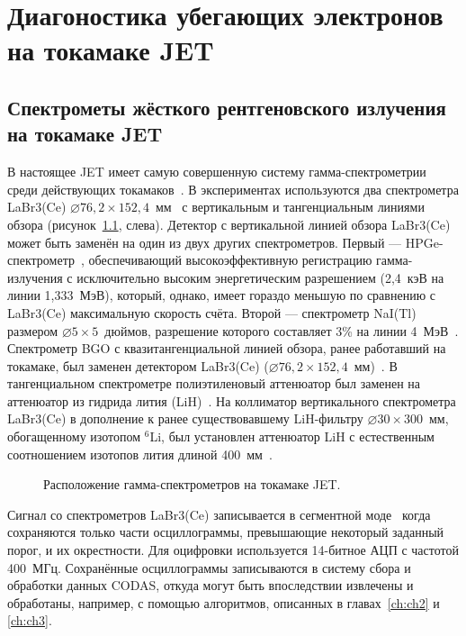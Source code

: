 \chapter{Диагоностика убегающих электронов на токамаке JET}
\label{ch:ch5}


\section{Спектрометы жёсткого рентгеновского излучения на токамаке JET}

В настоящее JET имеет самую совершенную систему гамма-спектрометрии среди действующих токамаков~\cite{Iliasova2022}. В экспериментах используются два спектрометра LaBr3(Ce) $\varnothing 76,2 \times 152,4$~мм~\cite{Nocente2010} с вертикальным и тангенциальным линиями обзора (рисунок~\ref{fig:jetHxrDetectorsScheme}, слева). Детектор с вертикальной линией обзора LaBr3(Ce) может быть заменён на один из двух других спектрометров. Первый --- HPGe-спектрометр~\cite{Tardocchi2011}, обеспечивающий высокоэффективную регистрацию гамма-излучения с исключительно высоким энергетическим разрешением (2,4~кэВ на линии 1,333~МэВ), который, однако, имеет гораздо меньшую по сравнению с LaBr3(Ce) максимальную скорость счёта. Второй --- спектрометр NaI(Tl) размером $\varnothing 5 \times 5$~дюймов, разрешение которого составляет 3\% на линии 4~МэВ~\cite{Tardocchi2008}. Спектрометр BGO с квазитангенциальной линией обзора, ранее работавший на токамаке, был заменен детектором LaBr3(Ce) ($\varnothing 76,2 \times 152,4$~мм)~\cite{Nocente2021}. В тангенциальном спектрометре полиэтиленовый аттенюатор был заменен на аттенюатор из гидрида лития (LiH)~\cite{Curuia2017}. На коллиматор вертикального спектрометра LaBr3(Ce) в дополнение к ранее существовавшему LiH-фильтру $\varnothing 30 \times 300$~мм, обогащенному изотопом ${}^6$Li, был установлен аттенюатор LiH с естественным соотношением изотопов лития длиной 400~мм~\cite{Murari2008}.

\begin{figure}[ht!]
  \caption{ Расположение гамма-спектрометров на токамаке JET.~\cite{Iliasova2022} }
  \label{fig:jetHxrDetectorsScheme}
\end{figure}

Сигнал со спектрометров LaBr3(Ce) записывается в сегментной моде~\cite{Pereira2008,Pereira2011} когда сохраняются только части осциллограммы, превышающие некоторый заданный порог, и их окрестности. Для оцифровки используется 14-битное АЦП с частотой 400~МГц. Сохранённые осциллограммы записываются в систему сбора и обработки данных CODAS, откуда могут быть впоследствии извлечены и обработаны, например, с помощью алгоритмов, описанных в главах~\ref{ch:ch2} и \ref{ch:ch3}. 

